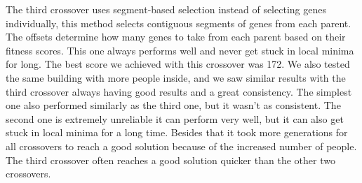 The third crossover uses segment-based selection instead of selecting genes individually, this method selects contiguous segments of genes from each parent. The offsets determine how many genes to take from each parent based on their fitness scores. This one always performs well and never get stuck in local minima for long. The best score we achieved with this crossover was 172. %
We also tested the same building with more people inside, and we saw similar results with the third crossover always having good results and a great consistency. The simplest one also performed similarly as the third one, but it wasn't as consistent. The second one is extremely unreliable it can perform very well, but it can also get stuck in local minima for a long time. Besides that it took more generations for all crossovers to reach a good solution because of the increased number of people. The third crossover often reaches a good solution quicker than the other two crossovers.

